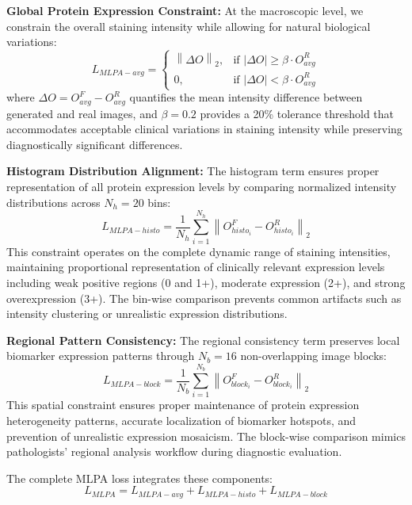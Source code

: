 \documentclass[journal,twoside,web]{ieeecolor}
\begin{document}
\textbf{Global Protein Expression Constraint:} 
At the macroscopic level, we constrain the overall staining intensity while allowing for natural biological variations:
\begin{equation}
L_{MLPA-{avg}} =  
\begin{cases}
\left\|\Delta O\right\|_{2}, & \text{if } |\Delta O| \geq \beta \cdot O_{avg}^R \\
0, & \text{if } |\Delta O| < \beta \cdot O_{avg}^R
\end{cases}
\end{equation}
where $\Delta O = O_{avg}^F -O_{avg}^R$ quantifies the mean intensity difference between generated and real images, and $\beta=0.2$ provides a 20\% tolerance threshold that accommodates acceptable clinical variations in staining intensity while preserving diagnostically significant differences.


\textbf{Histogram Distribution Alignment:} The histogram term ensures proper representation of all protein expression levels by comparing normalized intensity distributions across $N_h=20$ bins:
\begin{equation}
     L_{MLPA-{histo}} = \frac{1}{N_h}\sum_{i=1}^{N_h} \left\|O_{histo_i}^F-O_{histo_i}^R\right\|_{2}
\end{equation}
This constraint operates on the complete dynamic range of staining intensities, maintaining proportional representation of clinically relevant expression levels including weak positive regions (0 and 1+), moderate expression (2+), and strong overexpression (3+). The bin-wise comparison prevents common artifacts such as intensity clustering or unrealistic expression distributions.


\textbf{Regional Pattern Consistency:} The regional consistency term preserves local biomarker expression patterns through $N_b=16$ non-overlapping image blocks:
\begin{equation}
     L_{MLPA-{block}} = \frac{1}{N_b}\sum_{i=1}^{N_b} \left\|O_{block_i}^F-O_{block_i}^R\right\|_{2}
\end{equation}
{This spatial constraint ensures proper maintenance of protein expression heterogeneity patterns}, accurate localization of biomarker hotspots, and prevention of unrealistic expression mosaicism. The block-wise comparison mimics pathologists' regional analysis workflow during diagnostic evaluation.


The complete MLPA loss integrates these components:
\begin{equation}
    L_{MLPA} = L_{MLPA-{avg}} + L_{MLPA-{histo}} + L_{MLPA-{block}}
\end{equation}
\end{document}

